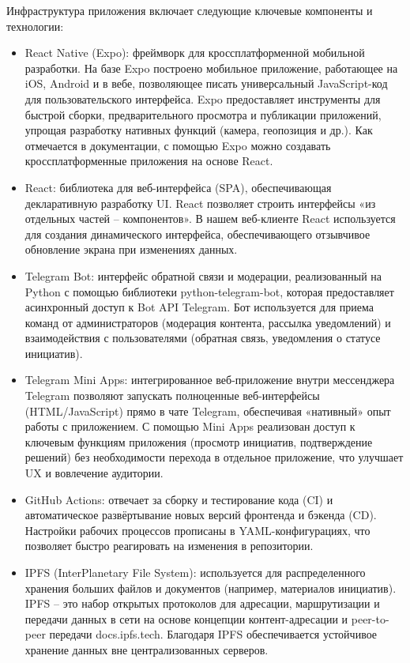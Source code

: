 \documentclass[
    14pt,
    specialist,
    candidate, %
    subf, %
    href,
    dotsinheaders=false
]{disser}
\begin{document}
Инфраструктура приложения включает следующие ключевые компоненты и технологии:

\begin{itemize}
  \item React Native (Expo): фреймворк для кроссплатформенной мобильной разработки. На базе Expo построено мобильное приложение, работающее на iOS, Android и в вебе, позволяющее писать универсальный JavaScript-код для пользовательского интерфейса. Expo предоставляет инструменты для быстрой сборки, предварительного просмотра и публикации приложений, упрощая разработку нативных функций (камера, геопозиция и др.). Как отмечается в документации, с помощью Expo можно создавать кроссплатформенные приложения на основе React.

  \item React: библиотека для веб-интерфейса (SPA), обеспечивающая декларативную разработку UI. React позволяет строить интерфейсы «из отдельных частей – компонентов». В нашем веб-клиенте React используется для создания динамического интерфейса, обеспечивающего отзывчивое обновление экрана при изменениях данных.

  \item Telegram Bot: интерфейс обратной связи и модерации, реализованный на Python с помощью библиотеки python-telegram-bot, которая предоставляет асинхронный доступ к Bot API Telegram. Бот используется для приема команд от администраторов (модерация контента, рассылка уведомлений) и взаимодействия с пользователями (обратная связь, уведомления о статусе инициатив).

  \item Telegram Mini Apps: интегрированное веб-приложение внутри мессенджера Telegram позволяют запускать полноценные веб-интерфейсы (HTML/JavaScript) прямо в чате Telegram, обеспечивая «нативный» опыт работы с приложением. С помощью Mini Apps реализован доступ к ключевым функциям приложения (просмотр инициатив, подтверждение решений) без необходимости перехода в отдельное приложение, что улучшает UX и вовлечение аудитории.

\item GitHub Actions: отвечает за сборку и тестирование кода (CI) и автоматическое развёртывание новых версий фронтенда и бэкенда (CD). Настройки рабочих процессов прописаны в YAML-конфигурациях, что позволяет быстро реагировать на изменения в репозитории.

\item IPFS (InterPlanetary File System): используется для распределенного хранения больших файлов и документов (например, материалов инициатив). IPFS – это набор открытых протоколов для адресации, маршрутизации и передачи данных в сети на основе концепции контент-адресации и peer-to-peer передачи docs.ipfs.tech. Благодаря IPFS обеспечивается устойчивое хранение данных вне централизованных серверов.


\end{itemize}
\end{document}
